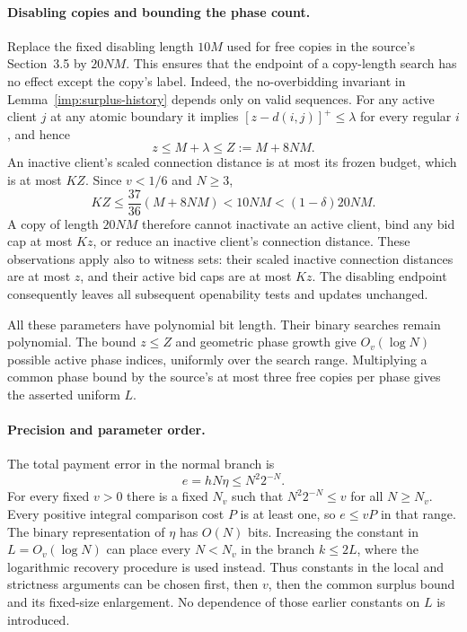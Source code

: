 \paragraph{Disabling copies and bounding the phase count.}
Replace the fixed disabling length $10M$ used for
free copies in the source's Section~3.5 by $20NM$. This ensures that
the endpoint of a copy-length search has no effect except the copy's
label. Indeed, the no-overbidding invariant in
Lemma~\ref{imp:surplus-history} depends only on valid sequences.
For any active client $j$ at any atomic boundary
it implies $[z-d(i,j)]^+\le\lambda$ for every regular $i$, and hence
\[
 z\le M+\lambda\le Z:=M+8NM.
\]
An inactive client's scaled connection distance is at most its frozen
budget, which is at most $KZ$. Since $v<1/6$ and $N\ge3$,
\[
 KZ\le\frac{37}{36}(M+8NM)<10NM<(1-\delta)20NM.
\]
A copy of length $20NM$ therefore cannot inactivate an active client,
bind any bid cap at most $Kz$, or reduce an inactive client's
connection distance. These observations apply also to witness sets:
their scaled inactive connection distances are at most $z$, and their active bid caps
are at most $Kz$. The disabling endpoint consequently leaves all
subsequent openability tests and updates unchanged.

All these parameters have polynomial bit length. Their binary searches
remain polynomial. The bound $z\le Z$ and geometric phase growth give
$O_v(\log N)$ possible active phase indices, uniformly over the
search range. Multiplying a common phase bound by the source's at
most three free copies per phase gives the asserted uniform $L$.

\paragraph{Precision and parameter order.}
The total payment error in the normal branch is
\begin{equation}
 e=hN\eta\le N^2 2^{-N}.
 \label{imp:precision}
\end{equation}
For every fixed $v>0$ there is a fixed $N_v$ such that
$N^2 2^{-N}\le v$ for all $N\ge N_v$.  Every positive integral
comparison cost $P$ is at least one, so $e\le vP$ in that range.
The binary representation of $\eta$ has $O(N)$ bits.
Increasing the constant in $L=O_v(\log N)$ can place every
$N<N_v$ in the branch $k\le2L$, where the logarithmic recovery
procedure is used instead.  Thus constants in the local and
strictness arguments can be chosen first, then $v$, then the common
surplus bound and its fixed-size enlargement.  No dependence of
those earlier constants on $L$ is introduced.
